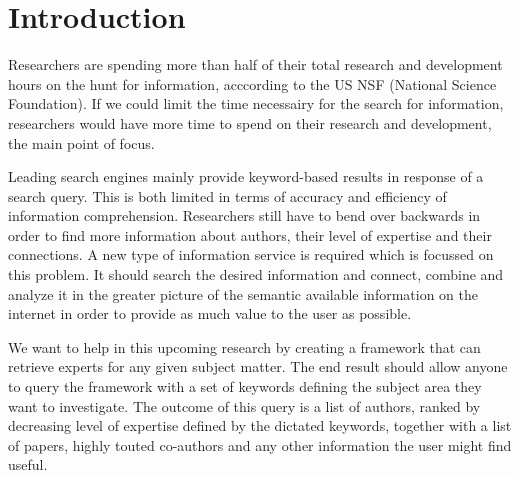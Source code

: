 \chapter{Introduction}

Researchers are spending more than half of their total research and development hours on the hunt for information, acccording to the US NSF (National Science Foundation). If we could limit the time necessairy for the search for information, researchers would have more time to spend on their research and development, the main point of focus.

Leading search engines mainly provide keyword-based results in response of a search query. This is both limited in terms of accuracy and efficiency of information comprehension. Researchers still have to bend over backwards in order to find more information about authors, their level of expertise and their connections. A new type of information service is required which is focussed on this problem. It should search the desired information and connect, combine and analyze it in the greater picture of the semantic available information on the internet in order to provide as much value to the user as possible.


We want to help in this upcoming research by creating a framework that can retrieve experts for any given subject matter. The end result should allow anyone to query the framework with a set of keywords defining the subject area they want to investigate. The outcome of this query is a list of authors, ranked by decreasing level of expertise defined by the dictated keywords, together with a list of papers, highly touted co-authors and any other information the user might find useful.



